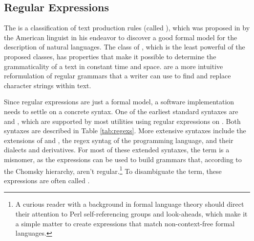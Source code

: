 \documentclass[
  a5paper,10pt,           %
  dvipsnames              %
]{book}
\begin{document}
\subsection{Regular Expressions}\label{sec:regexs}
The  is a classification of text production rules
(called ), which was proposed \cite{chomsky56} in
\citeyear{chomsky56} by the American linguist  in his
endeavor to discover a good formal model for the description of natural
languages. The class of , which is the least powerful
of the proposed classes, has properties that make it possible to determine the
grammaticality of a text in constant time and space.  are a more intuitive reformulation of regular grammars that a writer
can use to find and replace character strings within text.

Since regular expressions are just a formal model, a software implementation
needs to settle on a concrete syntax. One of the earliest standard syntaxes are
 and  \cite[part~1,~ch.\,9]{iso93:posix2}, which are
supported by most utilities using regular expressions on \Unices. Both syntaxes
are described in Table \ref{tab:regexs}. More extensive syntaxes include the
 extensions of  and , the regex syntag
of the  programming language, and their dialects and derivatives. For
most of these extended syntaxes, the term  is a misnomer, as the
expressions can be used to build grammars that, according to the Chomsky
hierarchy, aren't regular.\footnote{
  A curious reader with a background in formal language theory should direct
  their attention to Perl self-referencing groups and look-aheads, which make it
  a simple matter to create expressions that match non-context-free formal
  languages.
} To disambiguate the term, these expressions are often called
.

\begin{table}
  
  \label{tab:regexs}
\end{table}

\end{document}
